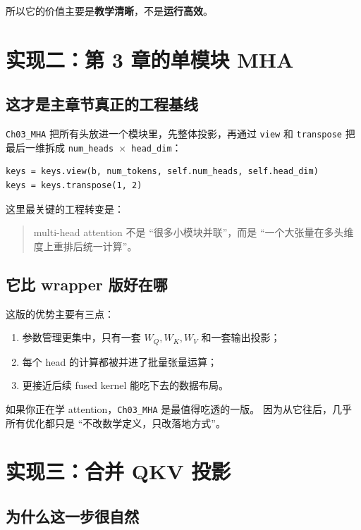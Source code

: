 \documentclass[12pt,a4paper]{ctexart}
\newcommand{\code}[1]{\texttt{#1}}
\begin{document}
所以它的价值主要是\textbf{教学清晰}，不是\textbf{运行高效}。

\section{实现二：第 3 章的单模块 MHA}

\subsection{这才是主章节真正的工程基线}

\code{Ch03\_MHA} 把所有头放进一个模块里，先整体投影，再通过
\code{view} 和 \code{transpose} 把最后一维拆成
\code{num\_heads \(\times\) head\_dim}：

\begin{lstlisting}[style=py]
keys = keys.view(b, num_tokens, self.num_heads, self.head_dim)
keys = keys.transpose(1, 2)
\end{lstlisting}

这里最关键的工程转变是：

\begin{quote}
multi-head attention 不是 ``很多小模块并联''，而是 ``一个大张量在多头维度上重排后统一计算''。
\end{quote}

\subsection{它比 wrapper 版好在哪}

这版的优势主要有三点：

\begin{enumerate}
  \item 参数管理更集中，只有一套 \(W_Q,W_K,W_V\) 和一套输出投影；
  \item 每个 head 的计算都被并进了批量张量运算；
  \item 更接近后续 fused kernel 能吃下去的数据布局。
\end{enumerate}

如果你正在学 attention，\code{Ch03\_MHA} 是最值得吃透的一版。
因为从它往后，几乎所有优化都只是 ``不改数学定义，只改落地方式''。

\section{实现三：合并 QKV 投影}

\subsection{为什么这一步很自然}
\end{document}
